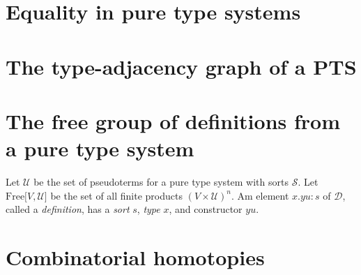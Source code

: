 \section{Equality in pure type systems}



\section{The type-adjacency graph of a PTS}

\section{The free group of definitions from a pure type system}

Let $\mathcal{U}$ be the set of pseudoterms for a pure type system with sorts $\mathcal{S}$. Let $\mathrm{Free}\lbrack V , \mathcal{U}\rbrack$ be the set of all finite products $(V \times \mathcal{U})^n$.
Am element $x . y u : s$ of $\mathcal{D}$, called a \emph{definition}, has a \emph{sort} $s$, \emph{type} $x$, and constructor $y u$. 



\section{Combinatorial homotopies}


